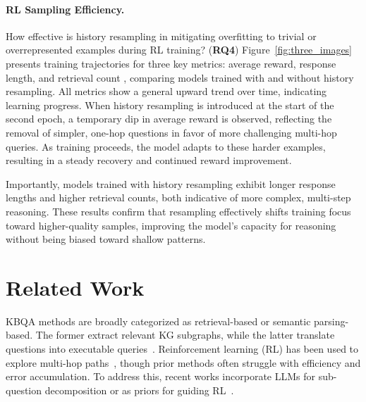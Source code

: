 \documentclass[10pt,conference]{IEEEtran}
\begin{document}

\paragraph{RL Sampling Efficiency.} How effective is history resampling in mitigating overfitting to trivial or overrepresented examples during RL training? (\textbf{RQ4})
Figure~\ref{fig:three_images} presents training trajectories for three key metrics: average reward, response length, and retrieval count \cite{song2025r1}, comparing models trained with and without history resampling. All metrics show a general upward trend over time, indicating learning progress. When history resampling is introduced at the start of the second epoch, a temporary dip in average reward is observed, reflecting the removal of simpler, one-hop questions in favor of more challenging multi-hop queries. As training proceeds, the model adapts to these harder examples, resulting in a steady recovery and continued reward improvement.

Importantly, models trained with history resampling exhibit longer response lengths and higher retrieval counts, both indicative of more complex, multi-step reasoning. These results confirm that resampling effectively shifts training focus toward higher-quality samples, improving the model’s capacity for reasoning without being biased toward shallow patterns.





\section{Related Work}
\label{sec:related-work}

KBQA methods are broadly categorized as retrieval-based or semantic parsing-based. The former extract relevant KG subgraphs, while the latter translate questions into executable queries~\cite{zhang2019complex, gu-su-2022-arcaneqa}. Reinforcement learning (RL) has been used to explore multi-hop paths~\cite{xiong2017deeppath, das2018go}, though prior methods often struggle with efficiency and error accumulation. To address this, recent works incorporate LLMs for sub-question decomposition or as priors for guiding RL~\cite{zhao2024kg, zhang2025collaborative}.
\end{document}
